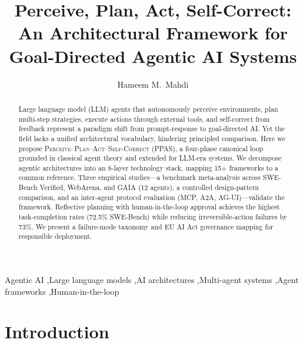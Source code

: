 \documentclass[review]{elsarticle}
\theoremstyle{definition}
\begin{document}
\linenumbers

\begin{frontmatter}

\title{Perceive, Plan, Act, Self-Correct: An Architectural Framework for Goal-Directed Agentic AI Systems}

\author[mayo]{Hameem M.\ Mahdi}


\begin{abstract}
Large language model (LLM) agents that autonomously perceive environments, plan multi-step strategies, execute actions through external tools, and self-correct from feedback represent a paradigm shift from prompt-response to goal-directed AI. Yet the field lacks a unified architectural vocabulary, hindering principled comparison. Here we propose \textsc{Perceive--Plan--Act--Self-Correct} (PPAS), a four-phase canonical loop grounded in classical agent theory and extended for LLM-era systems. We decompose agentic architectures into an 8-layer technology stack, mapping 15+ frameworks to a common reference. Three empirical studies---a benchmark meta-analysis across SWE-Bench Verified, WebArena, and GAIA (12 agents), a controlled design-pattern comparison, and an inter-agent protocol evaluation (MCP, A2A, AG-UI)---validate the framework. Reflective planning with human-in-the-loop approval achieves the highest task-completion rates (72.5\% SWE-Bench) while reducing irreversible-action failures by 73\%. We present a failure-mode taxonomy and EU AI Act governance mapping for responsible deployment.
\end{abstract}

\begin{keyword}
Agentic AI \sep Large language models \sep AI architectures \sep Multi-agent systems \sep Agent frameworks \sep Human-in-the-loop
\end{keyword}

\end{frontmatter}

\section{Introduction}\label{sec:introduction}
\end{document}
